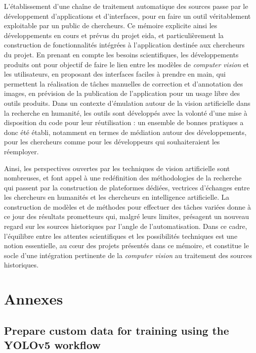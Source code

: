 \documentclass[a4paper,12pt,twoside]{book}
\newcommand{\cv}{\textit{computer vision}\xspace}
\newcommand{\eida}{\gls{eida}\xspace}
\newcommand{\ia}{intelligence artificielle\xspace}
\newcommand{\clearemptydoublepage}{\newpage{\pagestyle{empty}\cleardoublepage}}
\begin{document}
	L'établissement d'une chaîne de traitement automatique des sources passe par le développement d'applications et d'interfaces, pour en faire un outil véritablement exploitable par un public de chercheurs. Ce mémoire explicite ainsi les développements en cours et prévus du projet \eida, et particulièrement la construction de fonctionnalités intégrées à l'application destinée aux chercheurs du projet. En prenant en compte les besoins scientifiques, les développements produits ont pour objectif de faire le lien entre les modèles de \cv et les utilisateurs, en proposant des interfaces faciles à prendre en main, qui permettent la réalisation de tâches manuelles de correction et d'annotation des images, en prévision de la publication de l'application pour un usage libre des outils produits. Dans un contexte d'émulation autour de la vision artificielle dans la recherche en humanité, les outils sont développés avec la volonté d'une mise à disposition du code pour leur réutilisation : un ensemble de bonnes pratiques a donc été établi, notamment en termes de médiation autour des développements, pour les chercheurs comme pour les développeurs qui souhaiteraient les réemployer.
	
	Ainsi, les perspectives ouvertes par les techniques de vision artificielle sont nombreuses, et font appel à une redéfinition des méthodologies de la recherche qui passent par la construction de plateformes dédiées, vectrices d'échanges entre les chercheurs en humanités et les chercheurs en \ia. La construction de modèles et de méthodes pour effectuer des tâches variées donne à ce jour des résultats prometteurs qui, malgré leurs limites, présagent un nouveau regard sur les sources historiques par l'angle de l'automatisation. Dans ce cadre, l'équilibre entre les attentes scientifiques et les possibilités techniques est une notion essentielle, au cœur des projets présentés dans ce mémoire, et constitue le socle d'une intégration pertinente de la \cv au traitement des sources historiques.
    \clearemptydoublepage
    
\appendix
    \part*{Annexes}	
    
    \chapter[Prepare custom data for training]{\label{YOLOv5Training}Prepare custom data for training using the YOLOv5 workflow}
	    
	    \clearemptydoublepage
\end{document}
